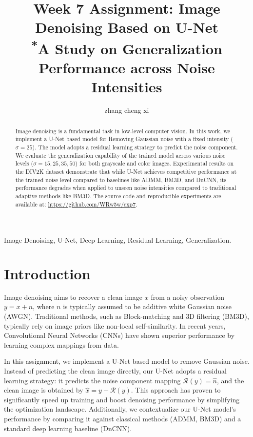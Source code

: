 \documentclass[conference]{IEEEtran}
\begin{document}
\title{Week 7 Assignment: Image Denoising Based on U-Net\\
{\footnotesize \textsuperscript{*}A Study on Generalization Performance across Noise Intensities}
}


\author{zhang cheng xi}

\maketitle

\begin{abstract}
Image denoising is a fundamental task in low-level computer vision. In this work, we implement a U-Net based model for Removing Gaussian noise with a fixed intensity ($\sigma=25$). The model adopts a residual learning strategy to predict the noise component. We evaluate the generalization capability of the trained model across various noise levels ($\sigma=15, 25, 35, 50$) for both grayscale and color images. Experimental results on the DIV2K dataset demonstrate that while U-Net achieves competitive performance at the trained noise level compared to baselines like ADMM, BM3D, and DnCNN, its performance degrades when applied to unseen noise intensities compared to traditional adaptive methods like BM3D.
The source code and reproducible experiments are available at: \url{https://github.com/WRw5w/exp7}.
\end{abstract}

\begin{IEEEkeywords}
Image Denoising, U-Net, Deep Learning, Residual Learning, Generalization.
\end{IEEEkeywords}

\section{Introduction}
Image denoising aims to recover a clean image $x$ from a noisy observation $y = x + n$, where $n$ is typically assumed to be additive white Gaussian noise (AWGN). Traditional methods, such as Block-matching and 3D filtering (BM3D), typically rely on image priors like non-local self-similarity. In recent years, Convolutional Neural Networks (CNNs) have shown superior performance by learning complex mappings from data.

In this assignment, we implement a U-Net based model to remove Gaussian noise. Instead of predicting the clean image directly, our U-Net adopts a residual learning strategy: it predicts the noise component mapping $\mathcal{R}(y) = \hat{n}$, and the clean image is obtained by $\hat{x} = y - \mathcal{R}(y)$. This approach has proven to significantly speed up training and boost denoising performance by simplifying the optimization landscape. Additionally, we contextualize our U-Net model's performance by comparing it against classical methods (ADMM, BM3D) and a standard deep learning baseline (DnCNN).
\end{document}
